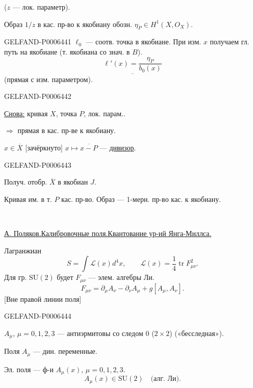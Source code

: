(\(z\) --- лок. параметр).

Образ \(1/z\) в кас. пр-во к якобиану обозн. \(\eta_P\in H^1(X,O_X)\).


\begin{GelfandAdjacentEvidence}{GELFAND-P000644}{1}
\(\ell_0\) --- соотв. точка в якобиане. При изм. \(x\) получаем гл. путь на якобиане
(т. якобиана со знач. в \(B\)).
\[
\underline{\ell'(x)=\frac{\eta_P}{b_0(x)}}
\]
(прямая с изм. параметром).
\end{GelfandAdjacentEvidence}
\begin{GelfandAdjacentEvidence}{GELFAND-P000644}{2}


\underline{Снова:} кривая \(X\), точка \(P\), лок. парам..

\(\Rightarrow\) прямая в кас. пр-ве к якобиану.

\(x\in\overline X\) [зачёркнуто] \(x\mapsto\overline{x-P}\) --- \underline{дивизор}.
\end{GelfandAdjacentEvidence}
\begin{GelfandAdjacentEvidence}{GELFAND-P000644}{3}


Получ. отобр. \(\overline X\) в якобиан \(J\).

Кривая им. в т. \(P\) кас. пр-во.
Образ --- 1-мерн. пр-во кас. к якобиану.

\begin{center}\textemdash\,\textperiodcentered\,\textemdash\end{center}

\underline{А. Поляков.}\quad\underline{Калибровочные поля.}\quad\underline{Квантование ур-ий Янга-Миллса.}

Лагранжиан
\[
S=\int\mathcal L(x)d^4x,\qquad \mathcal L(x)=\frac14\operatorname{tr} F_{\mu\nu}^2.
\]
Для гр. \(\mathrm{SU}(2)\) будет \(F_{\mu\nu}\) --- элем. алгебры Ли.
\[
F_{\mu\nu}=\partial_\mu A_\nu-\partial_\nu A_\mu+g[A_\mu,A_\nu].
\]
[Вне правой линии поля]
\end{GelfandAdjacentEvidence}
\begin{GelfandAdjacentEvidence}{GELFAND-P000644}{4}


\(A_\mu\), \(\mu=0,1,2,3\) --- антиэрмитовы со следом \(0\) (\(2\times2\)) («бесследная»).

Поля \(A_\mu\) --- дин. переменные.

Эл. поля --- ф-и \(A_\mu(x)\), \(\mu=0,1,2,3\).
\[
A_\mu(x)\in\mathrm{SU}(2)\quad\text{(алг. Ли)}.
\]
\end{GelfandAdjacentEvidence}
